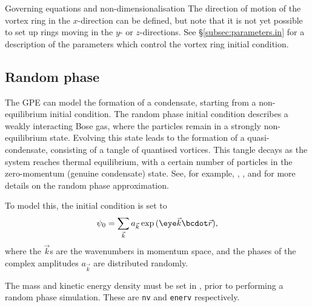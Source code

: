 \begin{chapter}{\label{cha:equations}Governing equations and
  non-dimensionalisation}
  The direction of motion of the vortex ring in the $x$-direction can be
  defined, but note that it is not yet possible to set up rings moving in the
  $y$- or $z$-directions.  See \S\ref{subsec:parameters.in} for a description
  of the parameters which control the vortex ring initial condition.

  \subsection{Random phase}
  The GPE can model the formation of a condensate, starting from a
  non-equilibrium initial condition.  The random phase initial condition
  describes a weakly interacting Bose gas, where the particles remain in a
  strongly non-equilibrium state.  Evolving this state leads to the formation
  of a quasi-condensate, consisting of a tangle of quantised vortices.  This
  tangle decays as the system reaches thermal equilibrium, with a certain
  number of particles in the zero-momentum (genuine condensate) state.  See,
  for example, \citet{BS02}, \citet{CJPPR05}, and \citet{BY07} for more details
  on the random phase approximation.

  To model this, the initial condition is set to
  \begin{equation*}
    \psi_{0} = \sum_{\vec{k}} a_{\vec{k}} \exp{(\eye\vec{k}\bcdot\vec{r})},
  \end{equation*}
  where the $\vec{k}$s are the wavenumbers in momentum space, and the phases of
  the complex amplitudes $a_{\vec{k}}$ are distributed randomly.

  The mass and kinetic energy density must be set in , prior to
  performing a random phase simulation.  These are \verb"nv" and \verb"enerv"
  respectively.

\end{chapter}
